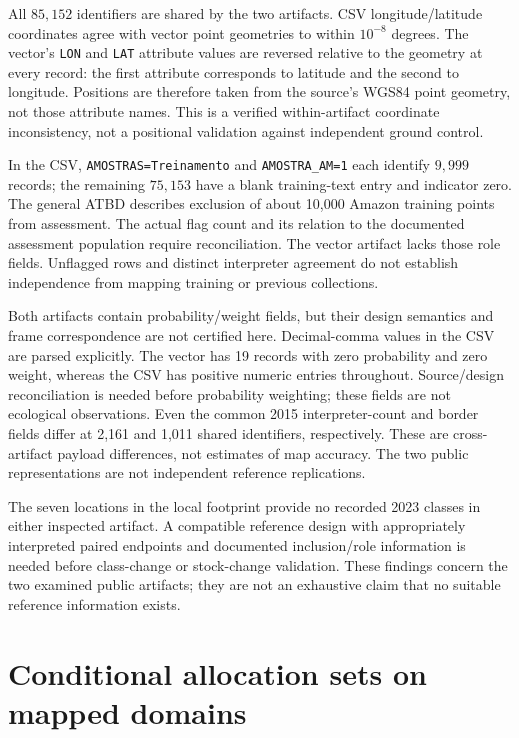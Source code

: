\documentclass[11pt,a4paper]{article}
\begin{document}
All $85{,}152$ identifiers are shared by the two artifacts. CSV longitude/latitude coordinates agree with vector point geometries to within $10^{-8}$ degrees. The vector's \texttt{LON} and \texttt{LAT} attribute values are reversed relative to the geometry at every record: the first attribute corresponds to latitude and the second to longitude. Positions are therefore taken from the source's WGS84 point geometry, not those attribute names. This is a verified within-artifact coordinate inconsistency, not a positional validation against independent ground control.

In the CSV, \texttt{AMOSTRAS=Treinamento} and \texttt{AMOSTRA\_AM=1} each identify $9{,}999$ records; the remaining $75{,}153$ have a blank training-text entry and indicator zero. The general ATBD describes exclusion of about 10,000 Amazon training points from assessment. The actual flag count and its relation to the documented assessment population require reconciliation. The vector artifact lacks those role fields. Unflagged rows and distinct interpreter agreement do not establish independence from mapping training or previous collections.

Both artifacts contain probability/weight fields, but their design semantics and frame correspondence are not certified here. Decimal-comma values in the CSV are parsed explicitly. The vector has 19 records with zero probability and zero weight, whereas the CSV has positive numeric entries throughout. Source/design reconciliation is needed before probability weighting; these fields are not ecological observations. Even the common 2015 interpreter-count and border fields differ at 2,161 and 1,011 shared identifiers, respectively. These are cross-artifact payload differences, not estimates of map accuracy. The two public representations are not independent reference replications.

The seven locations in the local footprint provide no recorded 2023 classes in either inspected artifact. A compatible reference design with appropriately interpreted paired endpoints and documented inclusion/role information is needed before class-change or stock-change validation. These findings concern the two examined public artifacts; they are not an exhaustive claim that no suitable reference information exists.

\section{Conditional allocation sets on mapped domains}
\end{document}
